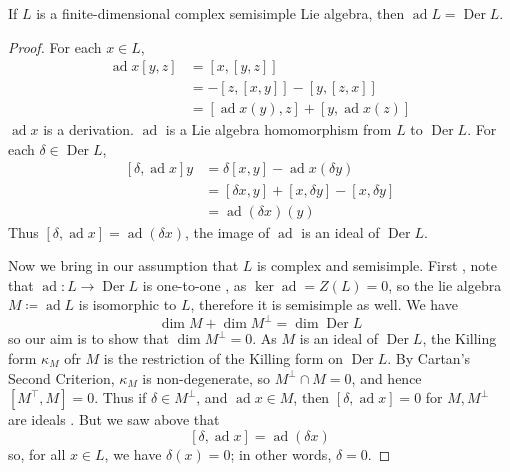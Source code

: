 \documentclass[../main.tex]{subfiles}
\begin{document}
\begin{proposition}{}{}
    If \(  L  \) is a finite-dimensional complex semisimple Lie algebra, then \(  \operatorname{ad}L= \operatorname{Der}L  \).  
\end{proposition}
\begin{proof}
 For each \(  x \in L  \), \[
 \begin{aligned}
 \operatorname{ad}x\left[ y,z \right]&= \left[ x,\left[ y,z \right]  \right]\\ 
  &=-[z,[x,y]]-[y,[z,x]]\\ 
   &= [\operatorname{ad}x\left( y \right),z ]+ \left[ y, \operatorname{ad}x\left( z \right)  \right]    
 \end{aligned}
 \] \(  \operatorname{ad}x  \) is a derivation. \(  \operatorname{ad}  \) is a Lie algebra homomorphism from \(  L  \) to \(  \operatorname{Der}L  \).
 For each \(   \delta \in \operatorname{Der}L  \), 
 \[
 \begin{aligned}
 [ \delta , \operatorname{ad}x]y&=  \delta \left[ x,y \right]-\operatorname{ad}x\left(  \delta y \right)\\ 
  &=    [ \delta x,y]+ [x, \delta y]-[x,  \delta y]\\ 
   &= \operatorname{ad}\left(  \delta x \right)\left( y \right)  
 \end{aligned}
 \]Thus \(  [ \delta ,\operatorname{ad}x]= \operatorname{ad}\left(  \delta x \right)   \), the image of \(  \operatorname{ad}  \) is an ideal of \(  \operatorname{Der}L  \).   

 Now we bring in our assumption that \(  L  \) is complex and semisimple. First , note that \(  \operatorname{ad}: L\to \operatorname{Der}L  \) is one-to-one , as \(  \operatorname{ker}\operatorname{ad}= Z\left( L \right)= 0   \), so the lie algebra \(  M\coloneqq \operatorname{ad}L  \) is isomorphic to \(  L  \), therefore it is semisimple as well. We have \[
 \operatorname{dim}M+ \operatorname{dim}M^{\perp}= \operatorname{dim}\operatorname{Der}L
 \]  so our aim is to show that \(  \operatorname{dim}M^{\perp}= 0  \). As \(  M  \) is an  ideal of \(  \operatorname{Der}L  \), the  Killing form \(   \kappa _{M}  \) ofr \(  M  \) is the restriction of the Killing form on \(  \operatorname{Der}L  \). By Cartan's Second Criterion, \(   \kappa _{M}  \) is non-degenerate, so \(  M^{\perp}\cap M= 0  \), and hence \(  \left[ M^{\top},M \right]= 0   \). Thus if \(   \delta \in M^{\perp}  \), and \(  \operatorname{ad}x\in M  \), then \(  \left[  \delta , \operatorname{ad}x \right]= 0   \) for \(  M, M^{\perp}  \) are ideals .     But we saw above that \[
 \left[  \delta , \operatorname{ad}x \right] = \operatorname{ad}\left(  \delta x \right) 
 \]so, for all \(  x \in L  \), we have \(   \delta \left( x \right)= 0   \); in other words, \(   \delta = 0  \).   
\end{proof}
\end{document}
